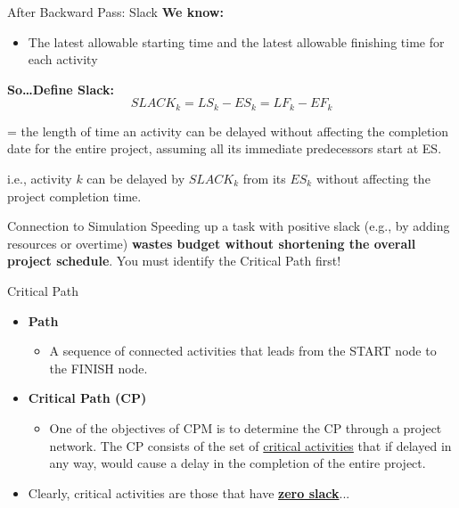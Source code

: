 \documentclass[11pt,aspectratio=169]{beamer}
\begin{document}
\begin{frame}{After Backward Pass: Slack}
    \textbf{We know:}
    \begin{itemize}
        \item The latest allowable starting time and the latest allowable finishing time for each activity
    \end{itemize}
    \vspace{1em}
    \textbf{So\dots Define Slack:}
    $$SLACK_k = LS_k - ES_k = LF_k - EF_k$$
    
    \begin{block}{}
        = the length of time an activity can be delayed without affecting the completion date for the entire project, assuming all its immediate predecessors start at ES.
    \end{block}
    
    i.e., activity $k$ can be delayed by $SLACK_k$ from its $ES_k$ without affecting the project completion time.
    
    \vspace{0.5em}
    \begin{alertblock}{Connection to Simulation}
        Speeding up a task with positive slack (e.g., by adding resources or overtime) \textbf{wastes budget without shortening the overall project schedule}. You must identify the Critical Path first!
    \end{alertblock}
\end{frame}

\begin{frame}{Critical Path}
    \begin{itemize}[<+->]
        \item \textbf{Path}
        \begin{itemize}
            \item A sequence of connected activities that leads from the START node to the FINISH node.
        \end{itemize}
        \item \textbf{Critical Path (CP)}
        \begin{itemize}
            \item One of the objectives of CPM is to determine the CP through a project network. The CP consists of the set of \underline{critical activities} that if delayed in any way, would cause a delay in the completion of the entire project.
        \end{itemize}
        \item Clearly, critical activities are those that have \underline{\textbf{zero slack}}...
    \end{itemize}
\end{frame}
\end{document}
